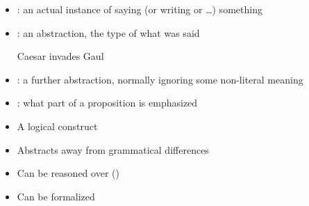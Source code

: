 \documentclass[a4paper,landscape,headrule,footrule,xetex,25pt]{foils}
\begin{document}

\begin{itemize}
\item {}: an actual instance of saying (or writing  or \ldots) something
\item {}: an abstraction, the type of what was said
  \begin{exe}
    \ex Caesar invades Gaul
  \end{exe}
\item {}: a further abstraction, normally ignoring some non-literal meaning
  \begin{exe}
    \ex {}
  \end{exe}
\newpage
\item {}: what part of a proposition is emphasized
  \begin{exe}
   \ex {}
   \ex {}
   \ex {}
   \ex {}
  \end{exe}
\end{itemize}


\begin{itemize}
\item A logical construct
\item Abstracts away from grammatical differences
\begin{exe}
  \ex {}
  \ex {}
  \ex  {} 
\end{exe}
\item Can be reasoned over ()
\item Can be formalized
\\ 
\end{itemize}

\end{document}
